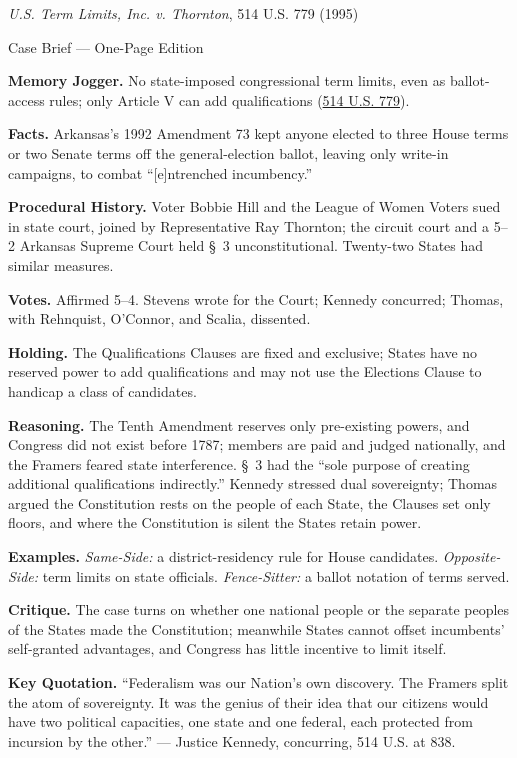 \documentclass[12pt]{article}
\begin{document}
\begin{center}
{\Large \textit{U.S. Term Limits, Inc. v. Thornton}, 514 U.S. 779 (1995)\par}
\vspace{0.3em}
{\normalsize Case Brief --- One-Page Edition\par}
\end{center}

\textbf{Memory Jogger.} No state-imposed congressional term limits, even as ballot-access rules; only Article V can add qualifications (\href{https://supreme.justia.com/cases/federal/us/514/779/}{514 U.S. 779}).

\textbf{Facts.} Arkansas's 1992 Amendment 73 kept anyone elected to three House terms or two Senate terms off the general-election ballot, leaving only write-in campaigns, to combat ``[e]ntrenched incumbency.''

\textbf{Procedural History.} Voter Bobbie Hill and the League of Women Voters sued in state court, joined by Representative Ray Thornton; the circuit court and a 5--2 Arkansas Supreme Court held \S~3 unconstitutional. Twenty-two States had similar measures.

\textbf{Votes.} Affirmed 5--4. Stevens wrote for the Court; Kennedy concurred; Thomas, with Rehnquist, O'Connor, and Scalia, dissented.

\textbf{Holding.} The Qualifications Clauses are fixed and exclusive; States have no reserved power to add qualifications and may not use the Elections Clause to handicap a class of candidates.

\textbf{Reasoning.} The Tenth Amendment reserves only pre-existing powers, and Congress did not exist before 1787; members are paid and judged nationally, and the Framers feared state interference. \S~3 had the ``sole purpose of creating additional qualifications indirectly.'' Kennedy stressed dual sovereignty; Thomas argued the Constitution rests on the people of each State, the Clauses set only floors, and where the Constitution is silent the States retain power.

\textbf{Examples.} \emph{Same-Side:} a district-residency rule for House candidates. \emph{Opposite-Side:} term limits on state officials. \emph{Fence-Sitter:} a ballot notation of terms served.

\textbf{Critique.} The case turns on whether one national people or the separate peoples of the States made the Constitution; meanwhile States cannot offset incumbents' self-granted advantages, and Congress has little incentive to limit itself.

\textbf{Key Quotation.} ``Federalism was our Nation's own discovery. The Framers split the atom of sovereignty. It was the genius of their idea that our citizens would have two political capacities, one state and one federal, each protected from incursion by the other.'' --- Justice Kennedy, concurring, 514 U.S. at 838.
\end{document}
